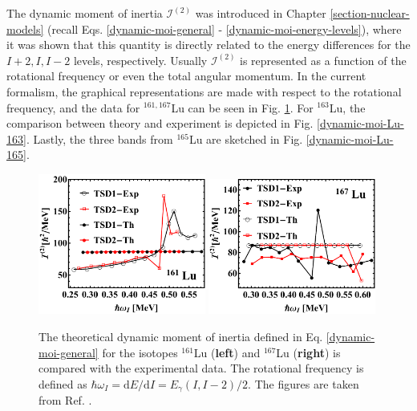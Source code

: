 The dynamic moment of inertia $\mathcal{I}^{(2)}$ was introduced in Chapter \ref{section-nuclear-models} (recall Eqs. \ref{dynamic-moi-general} - \ref{dynamic-moi-energy-levels}), where it was shown that this quantity is directly related to the energy differences for the $I+2,I,I-2$ levels, respectively. Usually $\mathcal{I}^{(2)}$ is represented as a function of the rotational frequency or even the total angular momentum. In the current formalism, the graphical representations are made with respect to the rotational frequency, and the data for $^{161,167}$Lu can be seen in Fig. \ref{dynamic-moi-Lu-161-167}. For $^{163}$Lu, the comparison between theory and experiment is depicted in Fig. \ref{dynamic-moi-Lu-163}. Lastly, the three bands from $^{165}$Lu are sketched in Fig. \ref{dynamic-moi-Lu-165}.
\begin{figure}
    \centering
    \includegraphics[width=0.49\textwidth]{Chapters/Figures/Lu-exp-energies/fig15_lu161.pdf}
    \includegraphics[width=0.49\textwidth]{Chapters/Figures/Lu-exp-energies/fig18_lu167.pdf}
    \caption{The theoretical dynamic moment of inertia defined in Eq. \ref{dynamic-moi-general} for the isotopes $^{161}$Lu (\textbf{left}) and $^{167}$Lu (\textbf{right}) is compared with the experimental data. The rotational frequency is defined as $\hbar\omega_I=\text{d}E/\text{d}I=E_\gamma(I,I-2)/2$. The figures are taken from Ref. \cite{raduta2020approach}.}
    \label{dynamic-moi-Lu-161-167}
\end{figure}
